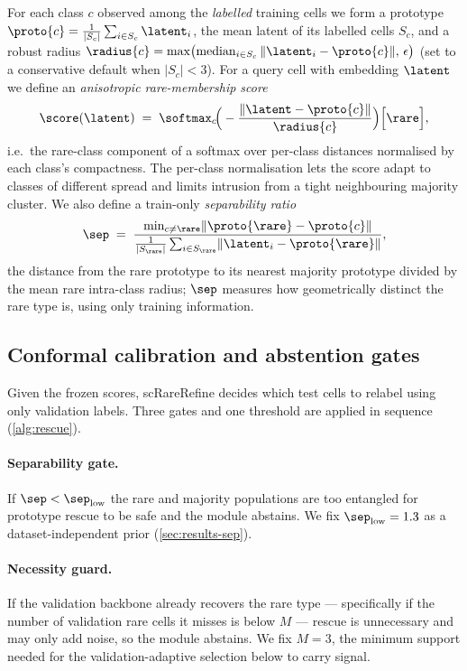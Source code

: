 For each class $c$ observed among the \emph{labelled} training cells we form a prototype
$\proto{c}=\frac{1}{|S_c|}\sum_{i\in S_c}\latent_i$, the mean latent of its labelled cells $S_c$, and a robust radius
$\radius{c}=\max\!\big(\mathrm{median}_{i\in S_c}\,\lVert \latent_i-\proto{c}\rVert,\,\epsilon\big)$
(set to a conservative default when $|S_c|<3$). For a query cell with embedding $\latent$ we define an
\emph{anisotropic rare-membership score}
\begin{equation}
\score(\latent) \;=\; \softmax_{c}\!\Big(-\frac{\lVert \latent-\proto{c}\rVert}{\radius{c}}\Big)\Big[\rare\Big],
\label{eq:score}
\end{equation}
i.e.\ the rare-class component of a softmax over per-class distances normalised by each class's compactness. The
per-class normalisation lets the score adapt to classes of different spread and limits intrusion from a tight
neighbouring majority cluster. We also define a train-only \emph{separability ratio}
\begin{equation}
\sep \;=\; \frac{\min_{c\neq \rare}\lVert \proto{\rare}-\proto{c}\rVert}{\frac{1}{|S_\rare|}\sum_{i\in S_\rare}\lVert \latent_i-\proto{\rare}\rVert},
\label{eq:sep}
\end{equation}
the distance from the rare prototype to its nearest majority prototype divided by the mean rare intra-class radius;
$\sep$ measures how geometrically distinct the rare type is, using only training information.

\subsection{Conformal calibration and abstention gates}
\label{sec:method-conformal}

Given the frozen scores, scRareRefine decides which test cells to relabel using only validation labels. Three gates
and one threshold are applied in sequence (\cref{alg:rescue}).

\paragraph{Separability gate.} If $\sep<\sep_{\mathrm{low}}$ the rare and majority populations are too entangled for
prototype rescue to be safe and the module abstains. We fix $\sep_{\mathrm{low}}=1.3$ as a dataset-independent prior
(\cref{sec:results-sep}).

\paragraph{Necessity guard.} If the validation backbone already recovers the rare type --- specifically if the number
of validation rare cells it misses is below $M$ --- rescue is unnecessary and may only add noise, so the module
abstains. We fix $M=3$, the minimum support needed for the validation-adaptive selection below to carry signal.

